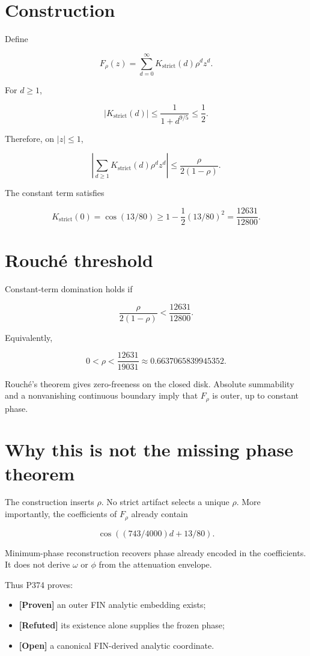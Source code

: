 \documentclass[11pt,a4paper,openany]{report}
\newcommand{\statusProven}{\textcolor{fingreen}{[Proven]}}
\newcommand{\statusRefuted}{\textcolor{finred}{[Refuted]}}
\begin{document}
\section{Construction}

Define

\[
F_\rho(z)=
\sum_{d=0}^{\infty}
K_{\mathrm{strict}}(d)\rho^dz^d.
\]

For \(d\geq1\),

\[
|K_{\mathrm{strict}}(d)|
\leq\frac{1}{1+d^{9/5}}
\leq\frac12.
\]

Therefore, on \(|z|\leq1\),

\[
\left|
\sum_{d\geq1}K_{\mathrm{strict}}(d)\rho^dz^d
\right|
\leq
\frac{\rho}{2(1-\rho)}.
\]

The constant term satisfies

\[
K_{\mathrm{strict}}(0)
=\cos(13/80)
\geq
1-\frac12(13/80)^2
=\frac{12631}{12800}.
\]

\section{Rouché threshold}

Constant-term domination holds if

\[
\frac{\rho}{2(1-\rho)}
<
\frac{12631}{12800}.
\]

Equivalently,

\[
0<\rho<
\frac{12631}{19031}
\approx0.6637065839945352.
\]

Rouché's theorem gives zero-freeness on the closed disk. Absolute summability and a nonvanishing continuous boundary imply that \(F_\rho\) is outer, up to constant phase.

\section{Why this is not the missing phase theorem}

The construction inserts \(\rho\). No strict artifact selects a unique \(\rho\). More importantly, the coefficients of \(F_\rho\) already contain

\[
\cos((743/4000)d+13/80).
\]

Minimum-phase reconstruction recovers phase already encoded in the coefficients. It does not derive \(\omega\) or \(\phi\) from the attenuation envelope.

Thus P374 proves:

\begin{itemize}
\item 
\textbf{\statusProven{}} an outer FIN analytic embedding exists;

\item 
\textbf{\statusRefuted{}} its existence alone supplies the frozen phase;

\item 
\textbf{[Open]} a canonical FIN-derived analytic coordinate.

\end{itemize}
\end{document}
